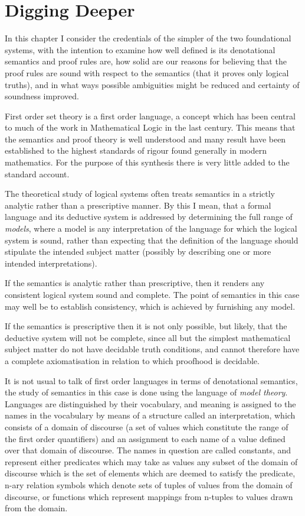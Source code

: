 \documentclass[10pt,titlepage]{book}
\begin{document}
\chapter{Digging Deeper}

In this chapter I consider the credentials of the simpler of the two foundational systems, with the intention to examine how well defined is its denotational semantics and proof rules are, how solid are our reasons for believing that the proof rules are sound with respect to the semantics (that it proves only logical truths), and in what ways possible ambiguities might be reduced and certainty of soundness improved.

First order set theory is a first order language, a concept which has been central to much of the work in Mathematical Logic in the last century.
This means that the semantics and proof theory is well understood and many result have been established to the highest standards of rigour found generally in modern mathematics.
For the purpose of this synthesis there is very little added to the standard account.

The theoretical study of logical systems often treats semantics in a strictly analytic rather than a prescriptive manner.
By this I mean, that a formal language and its deductive system is addressed by determining the full range of \emph{models}, where a model is any interpretation of the language for which the logical system is sound, rather than expecting that the definition of the language should stipulate the intended subject matter (possibly by describing one or more intended interpretations).

If the semantics is analytic rather than prescriptive, then it renders any consistent logical system sound and complete.
The point of semantics in this case may well be to establish consistency, which is achieved by furnishing any model.

If the semantics is prescriptive then it is not only possible, but likely, that the deductive system will not be complete, since all but the simplest mathematical subject matter do not have decidable truth conditions, and cannot therefore have a complete axiomatisation in relation to which proofhood is decidable.

It is not usual to talk of first order languages in terms of denotational semantics, the study of semantics in this case is done using the language of \emph{model theory}.
Languages are distinguished by their vocabulary, and meaning is assigned to the names in the vocabulary by means of a structure called an interpretation, which consists of a domain of discourse (a set of values which constitute the range of the first order quantifiers) and an assignment to each name of a value defined over that domain of discourse.
The names in question are called constants, and represent either predicates which may take as values any subset of the domain of discourse which is the set of elements which are deemed to satisfy the predicate, n-ary relation symbols which denote sets of tuples of values from the domain of discourse, or functions which represent mappings from n-tuples to values drawn from the domain.
\end{document}
